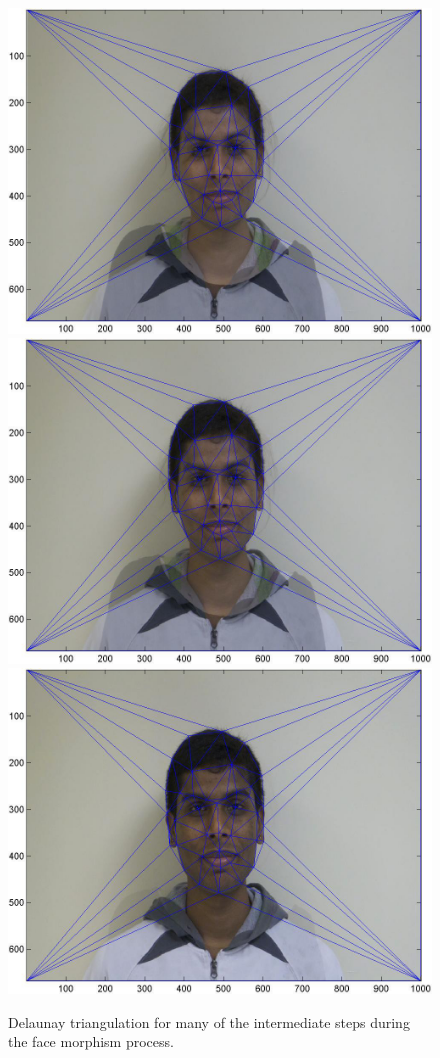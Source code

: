 \documentclass[11pt]{article}
\begin{document}
\begin{figure} [ht]
\begin{center}
\includegraphics[scale=0.1]{figs/triang/6.jpg}  
\includegraphics[scale=0.1]{figs/triang/7.jpg}  
\includegraphics[scale=0.1]{figs/triang/9.jpg}  
\caption{Delaunay triangulation for many of the intermediate steps during the face morphism process.}
\label{triang}
\end{center}
\end{figure}
\end{document}
